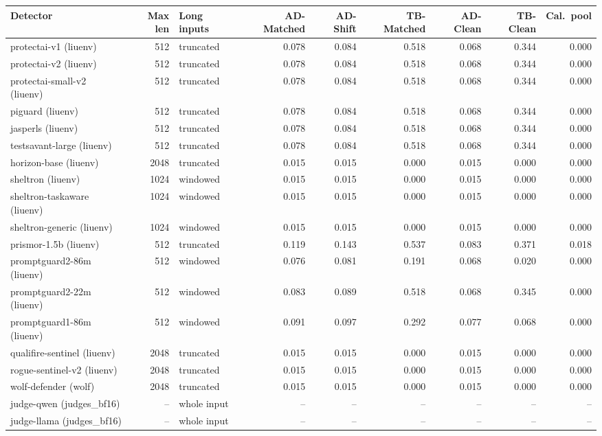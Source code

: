 \begin{tabular}{lrlrrrrrr}
\toprule
\textbf{Detector} & \textbf{Max len} & \textbf{Long inputs} & \textbf{AD-Matched} & \textbf{AD-Shift} & \textbf{TB-Matched} & \textbf{AD-Clean} & \textbf{TB-Clean} & \textbf{Cal.\ pool} \\
\midrule
protectai-v1 (liuenv) & 512 & truncated & 0.078 & 0.084 & 0.518 & 0.068 & 0.344 & 0.000 \\
protectai-v2 (liuenv) & 512 & truncated & 0.078 & 0.084 & 0.518 & 0.068 & 0.344 & 0.000 \\
protectai-small-v2 (liuenv) & 512 & truncated & 0.078 & 0.084 & 0.518 & 0.068 & 0.344 & 0.000 \\
piguard (liuenv) & 512 & truncated & 0.078 & 0.084 & 0.518 & 0.068 & 0.344 & 0.000 \\
jasperls (liuenv) & 512 & truncated & 0.078 & 0.084 & 0.518 & 0.068 & 0.344 & 0.000 \\
testsavant-large (liuenv) & 512 & truncated & 0.078 & 0.084 & 0.518 & 0.068 & 0.344 & 0.000 \\
horizon-base (liuenv) & 2048 & truncated & 0.015 & 0.015 & 0.000 & 0.015 & 0.000 & 0.000 \\
sheltron (liuenv) & 1024 & windowed & 0.015 & 0.015 & 0.000 & 0.015 & 0.000 & 0.000 \\
sheltron-taskaware (liuenv) & 1024 & windowed & 0.015 & 0.015 & 0.000 & 0.015 & 0.000 & 0.000 \\
sheltron-generic (liuenv) & 1024 & windowed & 0.015 & 0.015 & 0.000 & 0.015 & 0.000 & 0.000 \\
prismor-1.5b (liuenv) & 512 & truncated & 0.119 & 0.143 & 0.537 & 0.083 & 0.371 & 0.018 \\
promptguard2-86m (liuenv) & 512 & windowed & 0.076 & 0.081 & 0.191 & 0.068 & 0.020 & 0.000 \\
promptguard2-22m (liuenv) & 512 & windowed & 0.083 & 0.089 & 0.518 & 0.068 & 0.345 & 0.000 \\
promptguard1-86m (liuenv) & 512 & windowed & 0.091 & 0.097 & 0.292 & 0.077 & 0.068 & 0.000 \\
qualifire-sentinel (liuenv) & 2048 & truncated & 0.015 & 0.015 & 0.000 & 0.015 & 0.000 & 0.000 \\
rogue-sentinel-v2 (liuenv) & 2048 & truncated & 0.015 & 0.015 & 0.000 & 0.015 & 0.000 & 0.000 \\
wolf-defender (wolf) & 2048 & truncated & 0.015 & 0.015 & 0.000 & 0.015 & 0.000 & 0.000 \\
judge-qwen (judges\_bf16) & -- & whole input & -- & -- & -- & -- & -- & -- \\
judge-llama (judges\_bf16) & -- & whole input & -- & -- & -- & -- & -- & -- \\
\bottomrule
\end{tabular}

